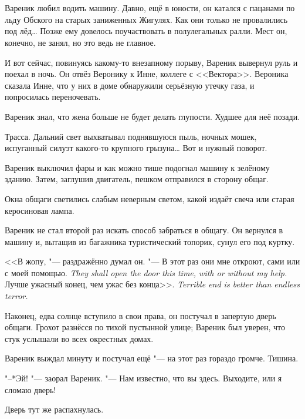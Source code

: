 \chapter{}

\textspace

\label{Thu_2012_08_30}

Вареник любил водить машину.
Давно, ещё в юности, он катался с пацанами по льду Обского на старых заниженных Жигулях.
Как они только не провалились под лёд\dots{}
Позже ему довелось поучаствовать в полулегальных ралли.
Мест он, конечно, не занял, но это ведь не главное.

И вот сейчас, повинуясь какому-то внезапному порыву, Вареник вывернул руль и поехал в ночь.
Он отвёз Веронику к Инне, коллеге с <<Вектора>>.
Вероника сказала Инне, что у них в доме обнаружили серьёзную утечку газа, и попросилась переночевать.

Вареник знал, что жена больше не будет делать глупости.
Худшее для неё позади.

Трасса.
Дальний свет выхватывал поднявшуюся пыль, ночных мошек, испуганный силуэт какого-то крупного грызуна\dots{}
Вот и нужный поворот.

Вареник выключил фары и как можно тише подогнал машину к зелёному зданию.
Затем, заглушив двигатель, пешком отправился в сторону общаг.

Окна общаги светились слабым неверным светом, какой издаёт свеча или старая керосиновая лампа.

Вареник не стал второй раз искать способ забраться в общагу.
Он вернулся в машину и, вытащив из багажника туристический топорик, сунул его под куртку.

<<В жопу, "--- раздражённо думал он.
{"--- В этот раз они мне откроют, сами или с моей помощью.}
{\textit{They shall open the door this time, with or without my help.}}
{Лучше ужасный конец, чем ужас без конца>>.}
{\textit{Terrible end is better than endless terror.}}

Наконец, едва солнце вступило в свои права, он постучал в запертую дверь общаги.
Грохот разнёсся по тихой пустынной улице;
Вареник был уверен, что стук услышали во всех окрестных домах.

Вареник выждал минуту и постучал ещё "--- на этот раз гораздо громче.
Тишина.

"--*Эй! "--- заорал Вареник.
"--- Нам известно, что вы здесь.
Выходите, или я сломаю дверь!

Дверь тут же распахнулась.

